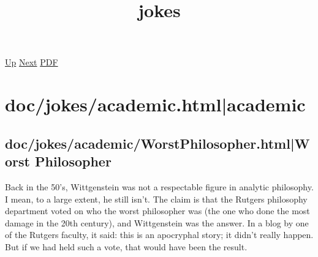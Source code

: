 \documentclass[12pt,a4paper]{report}
\begin{document}
 \href{doc.html}{Up} 
 \href{doc/phil.html}{Next} 
 \href{doc/jokes.pdf}{PDF} 
\title{jokes}

\tableofcontents

\part{doc/jokes/academic.html|academic}

\chapter{doc/jokes/academic/WorstPhilosopher.html|Worst Philosopher}
Back in the 50's, Wittgenstein was not a respectable figure in analytic
philosophy. I mean, to a large extent, he still isn't. The claim is that the
Rutgers philosophy department voted on who the worst philosopher was (the one
who done the most damage in the 20th century), and Wittgenstein was the answer.
In a blog by one of the Rutgers faculty, it said: this is an apocryphal story;
it didn't really happen. But if we had held such a vote, that would have been
the result.
\end{document}
